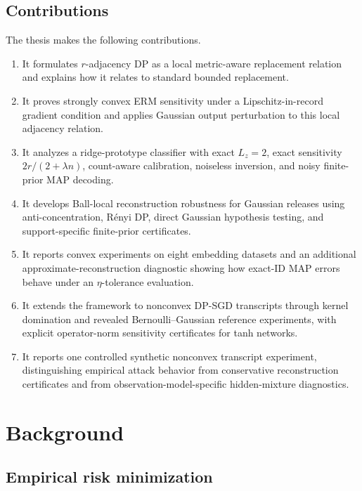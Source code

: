 \documentclass[11pt,a4paper]{report}
\theoremstyle{plain}
\theoremstyle{definition}
\theoremstyle{remark}
\begin{document}
\section*{Contributions}
The thesis makes the following contributions.
\begin{enumerate}[leftmargin=1.5em]
    \item It formulates $r$-adjacency DP as a local metric-aware replacement relation and explains how it relates to standard bounded replacement.
    \item It proves strongly convex ERM sensitivity under a Lipschitz-in-record gradient condition and applies Gaussian output perturbation to this local adjacency relation.
    \item It analyzes a ridge-prototype classifier with exact $L_z=2$, exact sensitivity $2r/(2+\lambda n)$, count-aware calibration, noiseless inversion, and noisy finite-prior MAP decoding.
    \item It develops Ball-local reconstruction robustness for Gaussian releases using anti-concentration, R\'enyi DP, direct Gaussian hypothesis testing, and support-specific finite-prior certificates.
    \item It reports convex experiments on eight embedding datasets and an additional approximate-reconstruction diagnostic showing how exact-ID MAP errors behave under an $\eta$-tolerance evaluation.
    \item It extends the framework to nonconvex DP-SGD transcripts through kernel domination and revealed Bernoulli--Gaussian reference experiments, with explicit operator-norm sensitivity certificates for tanh networks.
    \item It reports one controlled synthetic nonconvex transcript experiment, distinguishing empirical attack behavior from conservative reconstruction certificates and from observation-model-specific hidden-mixture diagnostics.
\end{enumerate}

\chapter{Background}
\label{ch:background}

\section{Empirical risk minimization}
\label{sec:bg-erm}
\end{document}
